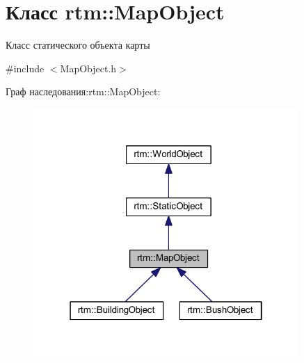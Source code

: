 \hypertarget{classrtm_1_1_map_object}{}\section{Класс rtm\+:\+:Map\+Object}
\label{classrtm_1_1_map_object}


Класс статического объекта карты  




{\ttfamily \#include $<$Map\+Object.\+h$>$}



Граф наследования\+:rtm\+:\+:Map\+Object\+:
\nopagebreak
\begin{figure}[H]
\begin{center}
\leavevmode
\includegraphics[width=286pt]{classrtm_1_1_map_object__inherit__graph}
\end{center}
\end{figure}
